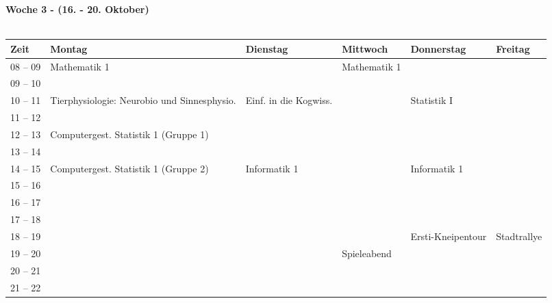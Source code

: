 \textbf{Woche 3 - (16. - 20. Oktober)}\\
\\
\begin{tabular}{|l|p{}|p{}|p{}|p{}|p{}|} \hline
	Zeit & Montag & Dienstag & Mittwoch & Donnerstag & Freitag \\ 
	\hline \hline
 08 -- 09 & \footnotesize{Mathematik 1} & & \footnotesize{Mathematik 1} & & \\ \cline{1-1}
 09 -- 10 & & & & & \\ \cline{1-5}
 10 -- 11 & \footnotesize{Tierphysiologie: Neurobio und Sinnesphysio.} & \footnotesize{Einf. in die Kogwiss.} & & \footnotesize{Statistik I} & \\ \cline{1-1} 
 11 -- 12 &  &  & &  & \\ \hline
 12 -- 13 & \footnotesize{Computergest. Statistik 1 (Gruppe 1)}& & & & \\ \cline{1-1}
 13 -- 14 & & & & & \\ \hline
 14 -- 15 & \footnotesize{Computergest. Statistik 1 (Gruppe 2)} & \footnotesize{Informatik 1} & & \footnotesize{Informatik 1} & \\  \cline {1-1}
 15 -- 16 & &  & & & \\ \hline
 16 -- 17 & & & & & \\ \cline{1-1}
 17 -- 18 & & & & & \\ \cline{1-1} \cline{4-5}
 18 -- 19 & & & & \scriptsize{Ersti-Kneipentour} \cellcolor{lightlightgray}& \scriptsize{Stadtrallye} \cellcolor{lightlightgray}\\ \cline{1-1}
 19 -- 20 & & &\scriptsize{Spieleabend} \cellcolor{lightlightgray} & \cellcolor{lightlightgray} & \cellcolor{lightlightgray}\\ \cline{1-1}
 20 -- 21 & & &\cellcolor{lightlightgray} &  \cellcolor{lightlightgray}& \cellcolor{lightlightgray}\\ \cline{1-1}
 21 -- 22 & & &\cellcolor{lightlightgray} &  \cellcolor{lightlightgray}& \cellcolor{lightlightgray}\\ \hline
\end{tabular}

